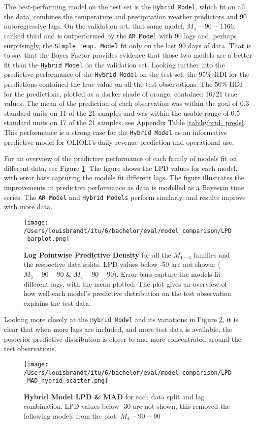 The best-performing model on the test set is the \texttt{Hybrid Model}, which
fit on all the data, combines the temperature and precipitation weather
predictors and 90 autoregressive lags. On the validation set, that same model,
$M_4{-}90{-}1166$, ranked third and is outperformed by the \texttt{AR Model}
with 90 lags and, perhaps surprisingly, the \texttt{Simple Temp.\ Model} fit
only on the last 90 days of data. That is to say that the Bayes Factor provides
evidence that those two models are a better fit than the \texttt{Hybrid Model}
on the validation set. Looking further into the predictive performance of the
\texttt{Hybrid Model} on the test set: the 95\% HDI for the predictions
contained the true value on all the test observations. The 50\% HDI for the
predictions, plotted as a darker shade of orange, contained 16/21 true values.
The mean of the prediction of each observation was within the goal of 0.3
standard units on 11 of the 21 samples and was within the usable range of 0.5
standard units on 17 of the 21 samples, see Appendix Table
\ref{tab:hybrid_preds}. This performance is a strong case for the
\texttt{Hybrid Model} as an informative predictive model for OLIOLI's daily
revenue prediction and operational use.

For an overview of the predictive performance of each family of models fit on
different data, see Figure \ref{fig:LPD_barplot}. The figure shows the LPD
values for each model, with error bars capturing the models fit different lags.
The figure illustrates the improvements in predictive performance as data is
modelled as a Bayesian time series. The \texttt{AR Model} and \texttt{Hybrid
Models} perform similarly, and results improve with more data.
\begin{figure}[ht]
  \centering
  \texttt{[image: /Users/louisbrandt/itu/6/bachelor/eval/model\_comparison/LPD\_barplot.png]}
  \caption{\textbf{Log Pointwise Predictive Density} for all the $M_{1-4}$ families and the respective data splits. LPD values below -50 are not shown: ($M_3{-}90{-}90$ \& $M_4{-}90{-}90$). Error bars capture the models fit different lags, with the mean plotted. The plot gives an overview of how well each model's predictive distribution on the test observation explains the test data.}
  \label{fig:LPD_barplot}
\end{figure}
Looking more closely at the \texttt{Hybrid Model} and its variations in Figure
\ref{fig:LPD_MAD_hybrid_scatter}, it is clear that when more lags are included,
and more test data is available, the posterior predictive distribution is
closer to and more concentrated around the test observations.
\begin{figure}[ht]
  \centering
  \texttt{[image: /Users/louisbrandt/itu/6/bachelor/eval/model\_comparison/LPD\_MAD\_hybrid\_scatter.png]}
  \caption{\textbf{Hybrid Model LPD \& MAD } for each data split and lag combination. LPD values below -30 are not shown, this removed the following models from the plot: $M_4-90-90$}
  \label{fig:LPD_MAD_hybrid_scatter}
\end{figure}
